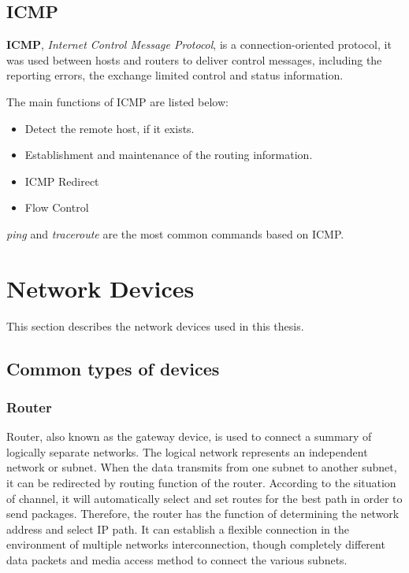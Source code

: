\subsection{ICMP}

\textbf{ICMP}, \textit{Internet Control Message Protocol}, is a connection-oriented protocol, it was used between hosts and routers to deliver control messages, including the reporting errors, the exchange limited control and status information.  

The main functions of ICMP are listed below:

\begin{itemize}
	\item Detect the remote host, if it exists.  
	\item Establishment and maintenance of the routing information.  
	\item ICMP Redirect  
	\item Flow Control
\end{itemize}

\textit{ping} and \textit{traceroute} are the most common commands based on ICMP. 

\section{Network Devices}

This section describes the network devices used in this thesis.

\subsection{Common types of devices}

\subsubsection{Router}
Router, also known as the gateway device, is used to connect a summary of logically separate networks. The logical network represents an independent network or subnet. When the data transmits from one subnet to another subnet, it can be redirected by routing function of the router. According to the situation of channel, it will automatically select and set routes for the best path in order to send packages. Therefore, the router has the function of determining the network address and select IP path. It can establish a flexible connection in the environment of multiple networks interconnection, though completely different data packets and media access method to connect the various subnets. 

